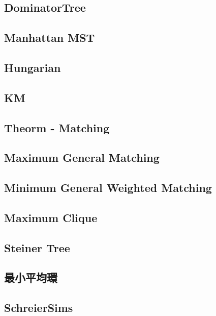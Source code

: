 \subsection{DominatorTree}


\subsection{Manhattan MST}

\subsection{Hungarian}

\subsection{KM}

\subsection{Theorm - Matching}

\subsection{Maximum General Matching}

\subsection{Minimum General Weighted Matching}

\subsection{Maximum Clique}

\subsection{Steiner Tree}

\subsection{最小平均環}

\subsection{SchreierSims}

